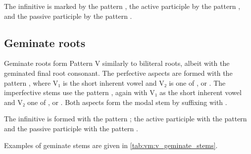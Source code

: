 \documentclass[grammar]{subfiles}
\begin{document}
The infinitive is marked by the pattern , the active participle
by the pattern , and the passive participle by the pattern
.  
 
 
\subsection{Geminate roots}
\label{ssec:vm:v_geminate_roots}

Geminate roots form Pattern V similarly to biliteral roots, albeit with the
geminated final root consonant. The perfective aspects are formed with the
pattern , where V₁ is the short inherent vowel and V₂ is one
of ,  or .  The imperfective stems use the pattern
, again with V₁ as the short inherent vowel and V₂ one of
,  or .  Both aspects form the modal stem by suffixing
with . 

The infinitive is formed with the pattern ; the active
participle with the pattern  and the passive participle with the
pattern . 

Examples of geminate stems are given in \cref{tab:vm:v_geminate_stems}. 

\begin{table}[h!]\small\capstart
  \centering
  \\
  \caption{Pattern V geminate stems \label{tab:vm:v_geminate_stems}}
\end{table}
\end{document}
